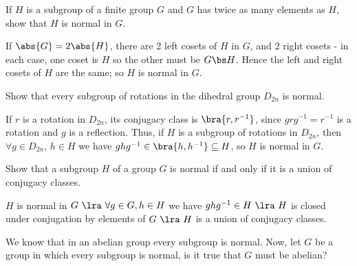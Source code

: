 \begin{solution}[\bf Solution.]

\end{solution}

\begin{problem}
If $H$ is a subgroup of a finite group $G$ and $G$ has twice as many elements as $H$, show that $H$ is normal in $G$.

\end{problem} 

\begin{solution}[\bf Solution.]
If $\abs{G} = 2\abs{H}$, there are 2 left cosets of $H$ in $G$, and 2 right cosets - in each case, one coset is $H$ so the other must be $G\bs H$. Hence the left and right cosets of $H$ are the same; so $H$ is normal in $G$.
\end{solution}

\begin{problem}
Show that every subgroup of rotations in the dihedral group $D_{2n}$ is normal.
\end{problem} 

\begin{solution}[\bf Solution.]
If $r$ is a rotation in $D_{2n}$, its conjugacy class is $\bra{r,r^{-1}}$, since $grg^{-1} =r^{-1}$ is a rotation and $g$ is a reflection. Thus, if $H$ is a subgroup of rotations in $D_{2n}$, then $\forall g\in D_{2n}$, $h\in H$ we have $ghg^{-1}\in \bra{h,h^{-1}} \subseteq H$, so $H$ is normal in $G$.
\end{solution}


\begin{problem}
Show that a subgroup $H$ of a group $G$ is normal if and only if it is a union of conjugacy classes.

\end{problem} 

\begin{solution}[\bf Solution.]
$H$ is normal in $G\ \lra \ \forall g\in G,h\in H$ we have $ghg^{-1} \in H \ \lra \ H$ is closed under conjugation by elements of $G\ \lra \ H$ is a union of conjugacy classes.
\end{solution}


\begin{problem}
We know that in an abelian group every subgroup is normal. Now, let $G$ be a group in which every subgroup is normal, is it true that $G$ must be abelian?

\end{problem} 

